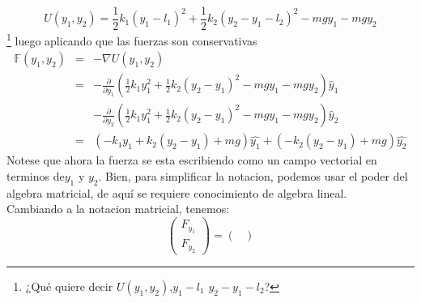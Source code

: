 \documentclass[12pt,a4paper]{article}
\begin{document}
$$U(y_1,y_2)=\frac{1}{2}k_1(y_1-l_1)^2+\frac{1}{2}k_2(y_2-y_1-l_2)^2-mgy_1-mgy_2$$\footnote{¿Qué quiere decir $U(y_1,y_2)$,$y_1-l_1$ $y_2-y_1-l_2$?}
luego aplicando que las fuerzas son conservativas
\begin{eqnarray*}
\mathbb{F}(y_1,y_2)&=&-\nabla U(y_1,y_2)\nonumber\\
&=&-\frac{\partial}{\partial y_1}\left(\frac{1}{2}k_1y_1^2+\frac{1}{2}k_2(y_2-y_1)^2-mgy_1-mgy_2\right)\hat y_1\\
&&-\frac{\partial}{\partial y_2}\left(\frac{1}{2}k_1y_1^2+\frac{1}{2}k_2(y_2-y_1)^2-mgy_1-mgy_2\right)\hat y_2\nonumber\\
&=&(-k_1y_1+k_2(y_2-y_1)+mg)\hat{y_1}+(-k_2(y_2-y_1)+mg)\hat{y_2}
\end{eqnarray*}
Notese que ahora la fuerza se esta escribiendo como un campo vectorial en terminos de$y_1$ y $y_2$.
Bien, para simplificar la notacion, podemos usar el poder del algebra matricial, de aquí se requiere conocimiento de algebra lineal.\\
Cambiando a la notacion matricial, tenemos:
$$
\left(
\begin{array}{c}
F_{y_1}\\
F_{y_2}
\end{array}
\right)
=
\left(
\begin{array}{c}

\end{array}
\right)
$$
\end{document}
